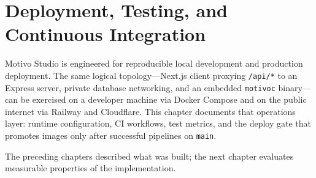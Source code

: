 \chapter{Deployment, Testing, and Continuous Integration}\label{ch:deployment-ci}

Motivo Studio is engineered for reproducible local development and production deployment.
The same logical topology---Next.js client proxying \texttt{/api/*} to an Express server, private database networking,
and an embedded \texttt{motivoc} binary---can be exercised on a developer machine via Docker Compose and on the public
internet via Railway and Cloudflare.
This chapter documents that operations layer: runtime configuration, CI workflows, test metrics, and the deploy gate
that promotes images only after successful pipelines on \texttt{main}.




The preceding chapters described what was built; the next chapter evaluates measurable properties of the
implementation.
